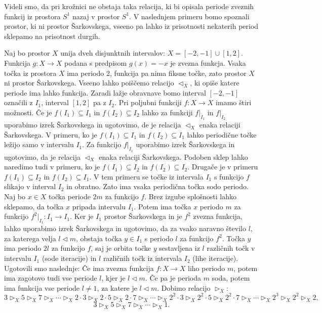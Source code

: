 \documentclass[mat2]{fmfdelo}
\begin{document}
Videli smo, da pri krožnici ne obstaja taka relacija, ki bi opisala periode zveznih funkcij iz prostora $S^1$ nazaj v prostor $S^1$. V naslednjem primeru bomo spoznali prostor, ki ni prostor Šarkovskega, vseeno pa lahko iz prisotnosti nekaterih period sklepamo na prisotnost durgih.
\begin{primer}
Naj bo prostor $X$ unija dveh disjunktnih intervalov: $X = [-2, -1] \cup [1, 2]$. Funkcija $g : X \to X$ podana s predpisom $g(x) = -x$ je zvezna funkcja. Vsaka točka iz prostora $X$ ima periodo 2, funkcija pa nima fiksne točke, zato prostor $X$ ni prostor Šarkovskega. Vseeno lahko poiščemo relacijo $\triangleleft_X$, ki opiše katere periode ima lahko funkcija. Zaradi lažje obravnave bomo interval $[-2, -1]$ označili z $I_1$, interval $[1, 2]$ pa z $I_2$. Pri poljubni funkciji $f: X \to X$ imamo štiri možnosti. Če je $f(I_1) \subseteq I_1$ in $f(I_2) \subseteq I_2$ lahko za funkciji $f|_{I_1}$ in $f|_{I_2}$ uporabimo izrek Šarkovskega in ugotovimo, de je relacija $\triangleleft_X$ enaka relaciji Šarkovskega. V primeru, ko je $f(I_1) \subseteq I_1$ in $f(I_2) \subseteq I_1$ lahko periodične točke ležijo samo v intervalu $I_1$. Za funkcijo $f|_{I_1}$ uporabimo izrek Šarkovskega in ugotovimo, da je relacija $\triangleleft_X$ enaka relaciji Šarkovskega. Podoben sklep lahko naredimo tudi v primeru, ko je $f(I_1) \subseteq I_2$ in $f(I_2) \subseteq I_2$. Drugače je v primeru $f(I_1) \subseteq I_2$ in $f(I_2) \subseteq I_1$. V tem primeru se točke iz intervala $I_1$ s funkcijo $f$ slikajo v interval $I_2$ in obratno. Zato ima vsaka periodična točka sodo periodo. Naj bo $x \in X$ točka periode $2m$ za funkcijo $f$. Brez izgube splošnosti lahko sklepamo, da točka $x$ pripada intervalu $I_1$. Potem ima točka $x$ periodo $m$ za funkcijo $f^2|_{I_1} :I_1 \to I_1$. Ker je $I_1$ prostor Šarkovskega in je $f^2$ zvezna funkcija, lahko uporabimo izrek Šarkovskega in ugotovimo, da za vsako naravno število $l$, za katerega velja $l \triangleleft m$, obstaja točka $y \in I_1$ s periodo $l$ za funkcijo $f^2$. Točka $y$ ima periodo $2l$ za funkcijo $f$, saj je orbita točke $y$ sestavljena iz $l$ različnih točk v intervalu $I_1$ (sode iteracije) in $l$ različnih točk iz intervala $I_2$ (lihe iteracije). 
Ugotovili smo naslednje: Če ima zvezna funkcija $f:X \to X$ liho periodo $m$, potem ima zagotovo tudi vse periode $l$, kjer je $l \triangleleft m$. Če pa je perioda $m$ soda, potem ima funkcija vse periode $l\neq1$, za katere je $l \triangleleft m$. 
Dobimo relacijo $\triangleright_X$:
$$3 \triangleright_X 5 \triangleright_X 7 \triangleright_X \cdots \triangleright_X 2\cdot 3 \triangleright_X 2\cdot 5 \triangleright_X 2\cdot 7 \triangleright_X \cdots \triangleright_X 2^2\cdot 3 \triangleright_X 2^2\cdot 5 \triangleright_X 2^2\cdot 7 \triangleright_X \cdots \triangleright_X 2^3 \triangleright_X 2^2 \triangleright_X 2,$$
$$3 \triangleright_X 5 \triangleright_X 7 \triangleright_X \cdots \triangleright_X 1.$$
\end{primer}
\end{document}
